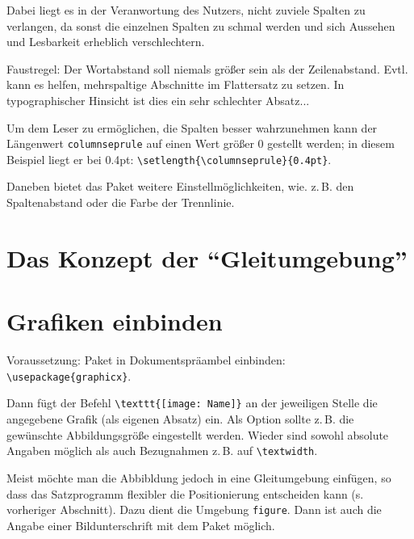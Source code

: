 \setlength{\columnseprule}{0.4pt}
\begin{multicols}{3}
 Dabei liegt es in der Veranwortung des Nutzers, nicht zuviele Spalten zu verlangen,
 da sonst die einzelnen Spalten zu schmal werden und sich Aussehen und Lesbarkeit erheblich
 verschlechtern.
 
 Faustregel: Der Wortabstand soll niemals größer sein als der Zeilenabstand.
 Evtl. kann es helfen, mehrspaltige Abschnitte im Flattersatz zu setzen.
 In typographischer Hinsicht ist dies ein sehr schlechter Absatz...
 
 Um dem Leser zu ermöglichen, die Spalten besser wahrzunehmen kann der Längenwert 
 \lstinline/columnseprule/ auf einen Wert größer 0 gestellt werden;
 in diesem Beispiel liegt er bei 0.4pt: \lstinline/\setlength{\columnseprule}{0.4pt}/.
 
 Daneben bietet das Paket weitere Einstellmöglichkeiten, wie. z.\,B. den Spaltenabstand
 oder die Farbe der Trennlinie.
\end{multicols}



\section{Das Konzept der \enquote{Gleitumgebung}}


\section{Grafiken einbinden}
\label{grafik-einbinden}

Voraussetzung: Paket  in Dokumentspräambel einbinden:
\lstinline/\usepackage{graphicx}/.

Dann fügt der Befehl \lstinline/\texttt{[image: Name]}/ an der jeweiligen Stelle
die angegebene Grafik (als eigenen Absatz) ein.
Als Option sollte z.\,B. die gewünschte Abbildungsgröße eingestellt werden.
Wieder sind sowohl absolute Angaben möglich als auch Bezugnahmen z.\,B. auf 
\lstinline/\textwidth/.

Meist möchte man die Abbibldung jedoch in eine Gleitumgebung einfügen, so dass das Satzprogramm
flexibler die Positionierung entscheiden kann (s. vorheriger Abschnitt).
Dazu dient die Umgebung \lstinline/figure/.
Dann ist auch die Angabe einer Bildunterschrift mit dem Paket  möglich.

